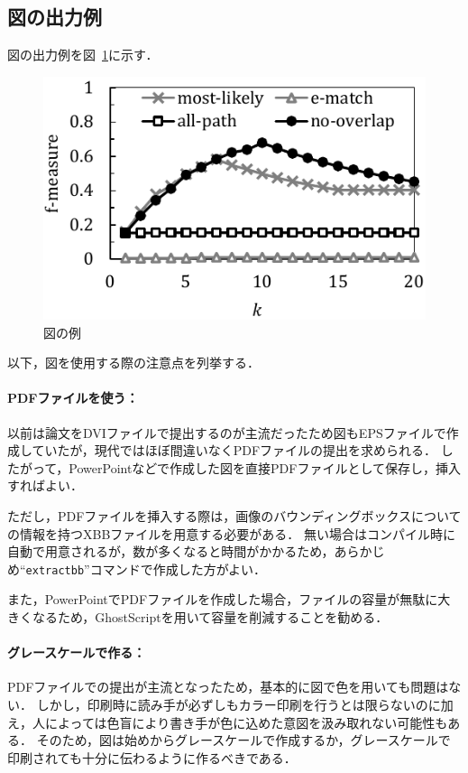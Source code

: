 \documentclass[lualatex]{ipsj}
\newcommand{\Fig}[1]{図~#1}
\begin{document}
  \subsection{図の出力例}
  図の出力例を\Fig{\ref{fig:sample}}に示す．
  
    \begin{figure}[t]
    \centering
    \includegraphics[scale=0.8]{./figures/sample_graph.pdf}
    \caption{図の例}
    \label{fig:sample}
    \end{figure}
  
  以下，図を使用する際の注意点を列挙する．
  
    \paragraph{PDFファイルを使う：}
    以前は論文をDVIファイルで提出するのが主流だったため図もEPSファイルで作成していたが，現代ではほぼ間違いなくPDFファイルの提出を求められる．
    したがって，PowerPointなどで作成した図を直接PDFファイルとして保存し，挿入すればよい．
    
    ただし，PDFファイルを挿入する際は，画像のバウンディングボックスについての情報を持つXBBファイルを用意する必要がある．
    無い場合はコンパイル時に自動で用意されるが，数が多くなると時間がかかるため，あらかじめ``\texttt{extractbb}''コマンドで作成した方がよい．

    また，PowerPointでPDFファイルを作成した場合，ファイルの容量が無駄に大きくなるため，GhostScriptを用いて容量を削減することを勧める．
    
    \paragraph{グレースケールで作る：}
    PDFファイルでの提出が主流となったため，基本的に図で色を用いても問題はない．
    しかし，印刷時に読み手が必ずしもカラー印刷を行うとは限らないのに加え，人によっては色盲により書き手が色に込めた意図を汲み取れない可能性もある．
    そのため，図は始めからグレースケールで作成するか，グレースケールで印刷されても十分に伝わるように作るべきである．
    
\end{document}

